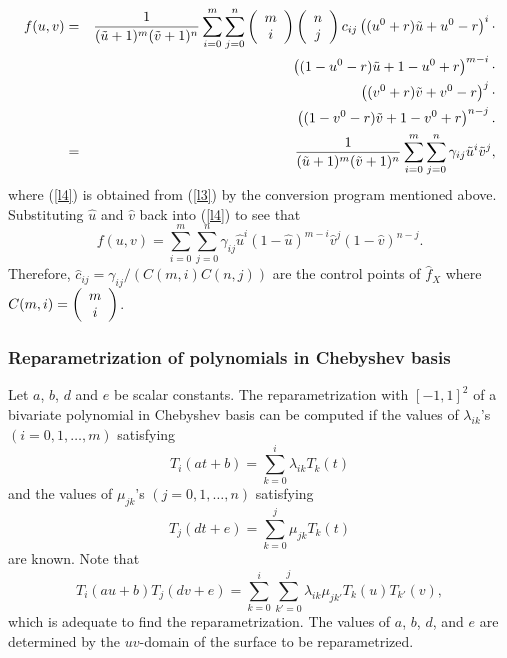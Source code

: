 \documentclass[12pt]{article}
\begin{document}
\begin{eqnarray}
f(u,v) &=& \frac{1}{(\tilde{u}+1)^m (\tilde{v}+1)^n} \sum_{i=0}^m \sum_{j=0}^n \nchoosek{m}{i}\nchoosek{n}{j}c_{ij}
\left( (u^0+r)\tilde{u} + u^0 - r  \right)^i \cdot \nonumber \\
& & \hspace{130 pt} \left((1-u^0-r)\tilde{u}+1-u^0+r \right)^{m-i} \cdot \nonumber \\
& & \hspace{130 pt} \left( (v^0+r)\tilde{v} + v^0 - r  \right)^j \cdot \nonumber \\
& & \hspace{130 pt} \left((1-v^0-r)\tilde{v}+1-v^0+r \right)^{n-j}. \label{l3} \\
& = & \frac{1}{(\tilde{u}+1)^m (\tilde{v}+1)^n}\sum_{i=0}^m \sum_{j=0}^n \gamma_{ij}\tilde{u}^i\tilde{v}^j, \label{l4}
\end{eqnarray}
where (\ref{l4}) is obtained from (\ref{l3}) by
the conversion program mentioned above. Substituting $\hat{u}$ and $\hat{v}$ back
into (\ref{l4}) to see that
\begin{equation}
f(u,v) =
\sum_{i=0}^m \sum_{j=0}^n \gamma_{ij}\hat{u}^i(1-\hat{u})^{m-i}\hat{v}^j(1-\hat{v})^{n-j}.
\end{equation}
Therefore, $\hat{c}_{ij} = \gamma_{ij}/(C(m,i)C(n,j))$ are the
control points of $\hat{f}_X$ where $C(m,i) = \left(\begin{array}{c} m\\ i \end{array} \right)$.

\subsubsection{Reparametrization of polynomials in Chebyshev
basis}  Let $a$, $b$, $d$ and $e$ be scalar constants.  The
reparametrization with $[-1,1]^2$ of a bivariate polynomial in
Chebyshev basis can be computed if the values of $\lambda_{ik}$'s
$(i = 0,1,\ldots, m)$ satisfying
\[
T_i(at+b) = \sum_{k=0}^i \lambda_{ik} T_k(t)
\]
and the values of $\mu_{jk}$'s $(j=0,1,\ldots,n)$ satisfying
\[
T_j(dt+e) = \sum_{k=0}^j \mu_{jk} T_k(t)
\]
are known.  Note that
\[
T_i(au+b)T_j(dv+e) = \sum_{k=0}^i \sum_{k'=0}^j \lambda_{ik}
\mu_{jk'} T_k(u)T_{k'}(v),
\]
which is adequate to find the reparametrization.  The values of
$a$, $b$, $d$, and $e$ are determined by the $uv$-domain of the
surface to be reparametrized.
\end{document}
